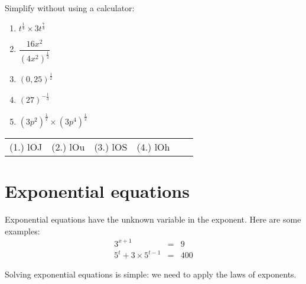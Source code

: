 \begin{exercises}{}{
Simplify without using a calculator:
\begin{multicols}{2}
\begin{enumerate}[label=\textbf{\arabic*}., itemsep=5pt]
 \item $ t^{\frac{1}{4}} \times 3t^{\frac{7}{4}} $
 \item $ \dfrac{16x^2}{(4x^2)^{\frac{1}{2}}} $
 \item $ (0,25)^{\frac{1}{2}} $
 \item $ (27)^{-\frac{1}{3}} $
 \item $ (3p^2)^{\frac{1}{2}} \times (3p^4)^{\frac{1}{2}} $
\end{enumerate}
\end{multicols}
\practiceinfo
\par \practiceinfo
\begin{tabular}[h]{cccccc}
(1.) lOJ  &  (2.) lOu  &  (3.) lOS  &  (4.) lOh  & 
\end{tabular}
}
\end{exercises}




\section{Exponential equations}

Exponential equations have the unknown variable in the exponent. Here are some examples:
\begin{eqnarray*}
 3^{x+1} & = & 9 \\
5^t + 3 \times 5^{t-1} & = & 400
\end{eqnarray*}

Solving exponential equations is simple: we need to apply the laws of exponents.


